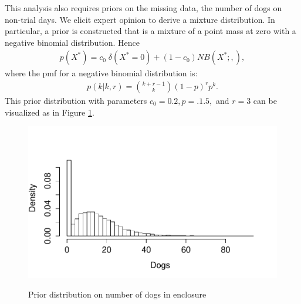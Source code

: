 \documentclass[aoas,preprint]{imsart}
\numberwithin{equation}{section}
\theoremstyle{plain}
\begin{document}
This analysis also requires priors on the missing data, the number of dogs on non-trial days. We elicit expert opinion to derive a mixture distribution. In particular, a prior is constructed that is a mixture of a point mass at zero with a negative binomial distribution. Hence
\begin{eqnarray}
p(X^*) = c_0 \; \delta(X^* = 0) + (1-c_0)NB(X^*; , ),
\end{eqnarray}
where the pmf for a negative binomial distribution is: 
\begin{eqnarray*}
p(k|k,r) = {k + r -1 \choose k} (1-p)^r p ^k.
\end{eqnarray*}
This prior distribution with parameters $c_0 = 0.2, p=.1.5,$ and $r=3$ can be visualized as in Figure \ref{fig:Prior}.
\begin{figure}[h!]
\begin{center}
\caption{Prior distribution on number of dogs in enclosure}
\includegraphics[width=1\textwidth]{Mixture_prior.pdf}
\label{fig:Prior}
\end{center}
\end{figure}
\end{document}
